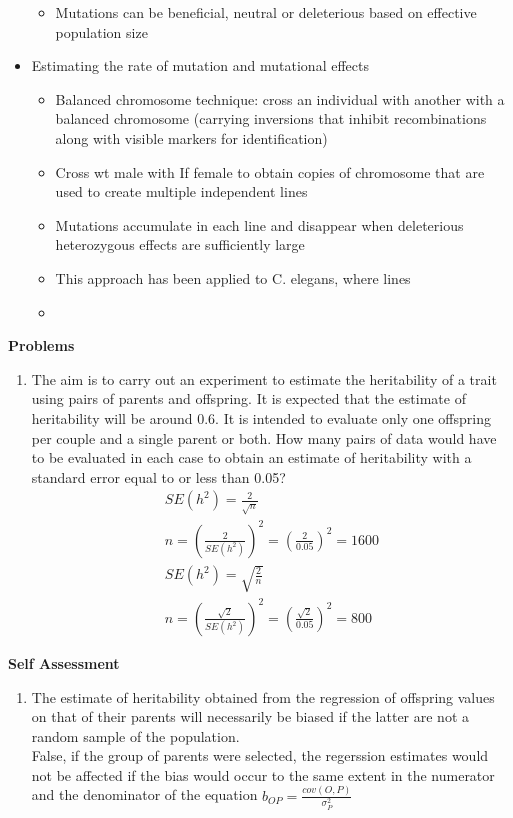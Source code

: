 \documentclass[12pt]{amsart}
\begin{document}
\begin{itemize}
\begin{itemize}
\item Mutations can be beneficial, neutral or deleterious based on effective population size
\end{itemize}
\item Estimating the rate of mutation and mutational effects
\begin{itemize}
\item Balanced chromosome technique: cross an individual with another with a balanced chromosome (carrying inversions that inhibit recombinations along with visible markers for identification) 
\item Cross wt male with If female to obtain copies of chromosome that are used to create multiple independent lines
\item Mutations accumulate in each line and disappear when deleterious heterozygous effects are sufficiently large
\item This approach has been applied to C. elegans, where lines 
\item 
\end{itemize}
\end{itemize}

{\large \bf Problems}   
\begin{enumerate}
\item The aim is to carry out an experiment to estimate the heritability of a trait using pairs of parents and offspring. It is expected that the estimate of heritability will be around 0.6. It is intended to evaluate only one offspring per couple and a single parent or both. How many pairs of data would have to be evaluated in each case to obtain an estimate of heritability with a standard error equal to or less than 0.05?
\begin{gather*}
SE(h^2) = \frac{2}{\sqrt{n}} \\
n = (\frac{2}{SE(h^2)})^2 = (\frac{2}{0.05})^2 = 1600\\
SE(h^2) = \sqrt{\frac{2}{n}}\\
n = (\frac{\sqrt{2}}{SE(h^2)})^2 = (\frac{\sqrt{2}}{0.05})^2 = 800
\end{gather*}
\end{enumerate}

{\large \bf Self Assessment}
\begin{enumerate}
\item The estimate of heritability obtained from the regression of offspring values on that of their parents will necessarily be biased if the latter are not a random sample of the population.\\
False, if the group of parents were selected, the regerssion estimates would not be affected if the bias would occur to the same extent in the numerator and the denominator of the equation $b_{OP} = \frac{cov(O,P)}{\sigma^2_P}$\\

\end{enumerate}


\medskip
\end{document}
